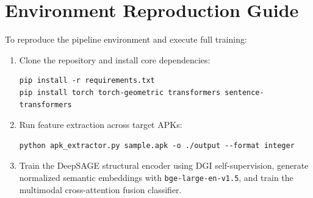 \documentclass[12pt,a4paper,oneside]{report}
\begin{document}
\section{Environment Reproduction Guide}
To reproduce the pipeline environment and execute full training:
\begin{enumerate}
    \item Clone the repository and install core dependencies:
    \begin{verbatim}
pip install -r requirements.txt
pip install torch torch-geometric transformers sentence-transformers
    \end{verbatim}
    \item Run feature extraction across target APKs:
    \begin{verbatim}
python apk_extractor.py sample.apk -o ./output --format integer
    \end{verbatim}
    \item Train the DeepSAGE structural encoder using DGI self-supervision, generate normalized semantic embeddings with \texttt{bge-large-en-v1.5}, and train the multimodal cross-attention fusion classifier.
\end{enumerate}
\end{document}
